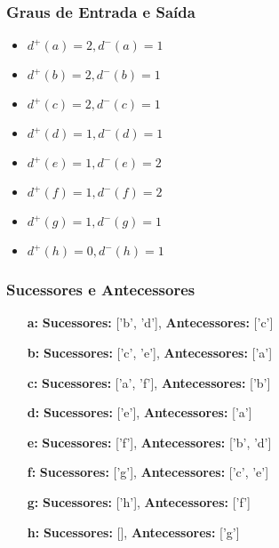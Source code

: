 \documentclass[a4paper,12pt]{article}
\begin{document}
\subsubsection*{Graus de Entrada e Saída}
\begin{multicols}{3}
\begin{itemize}[nosep]
    \item $d^{+}(a)=2, d^{-}(a)=1$
    \item $d^{+}(b)=2, d^{-}(b)=1$
    \item $d^{+}(c)=2, d^{-}(c)=1$
    \item $d^{+}(d)=1, d^{-}(d)=1$
    \item $d^{+}(e)=1, d^{-}(e)=2$
    \item $d^{+}(f)=1, d^{-}(f)=2$
    \item $d^{+}(g)=1, d^{-}(g)=1$
    \item $d^{+}(h)=0, d^{-}(h)=1$
\end{itemize}
\end{multicols}

\subsubsection*{Sucessores e Antecessores}
\begin{itemize}[leftmargin=*]
    \item[\textbf{a:}] \textbf{Sucessores:} ['b', 'd'], \textbf{Antecessores:} ['c']
    \item[\textbf{b:}] \textbf{Sucessores:} ['c', 'e'], \textbf{Antecessores:} ['a']
    \item[\textbf{c:}] \textbf{Sucessores:} ['a', 'f'], \textbf{Antecessores:} ['b']
    \item[\textbf{d:}] \textbf{Sucessores:} ['e'], \textbf{Antecessores:} ['a']
    \item[\textbf{e:}] \textbf{Sucessores:} ['f'], \textbf{Antecessores:} ['b', 'd']
    \item[\textbf{f:}] \textbf{Sucessores:} ['g'], \textbf{Antecessores:} ['c', 'e']
    \item[\textbf{g:}] \textbf{Sucessores:} ['h'], \textbf{Antecessores:} ['f']
    \item[\textbf{h:}] \textbf{Sucessores:} [], \textbf{Antecessores:} ['g']
\end{itemize}
\end{document}
